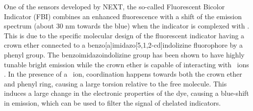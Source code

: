 \documentclass[aps,prl,reprint,longbibliography,superscriptaddress, english]{revtex4-1}
\begin{document}
One of the sensors developed by NEXT, the so-called 
Fluorescent Bicolor Indicator (FBI) \cite{rivilla_fluorescent_2020} combines an enhanced fluorescence with a shift of the emission spectrum (about 30 nm towards the blue) when the indicator is complexed with \Bapp.  This is due to the specific molecular design of the fluorescent indicator having a crown ether connected to a benzo[a]imidazo[5,1,2-cd]indolizine fluorophore by a phenyl group. The benzoimidazoindolizine group has been shown to have highly tunable bright emission\cite{Stasyuk_benzo,Levesque_general} while the crown ether is capable of interacting with \Bapp\ ions \cite{valeur_chemical,maleknia_cavity-size-dependent_2002}. In the presence of a \Bapp\ ion, coordination happens towards both the crown ether and phenyl ring, causing a large torsion relative to the free molecule. This induces a large change in the electronic properties of the dye, causing a blue-shift in emission, which can be used to filter the signal of chelated indicators.


%
%


 
\end{document}
